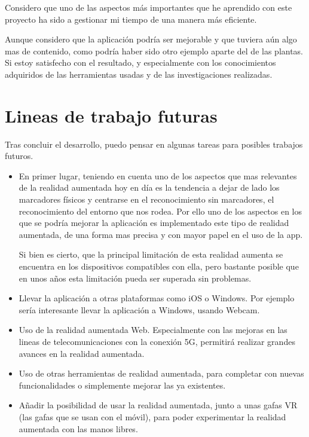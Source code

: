 Considero que uno de las aspectos más importantes que he aprendido con este proyecto ha sido a gestionar mi tiempo de una manera más eficiente.

Aunque considero que la aplicación podría ser mejorable y que tuviera aún algo mas de contenido, como podría haber sido otro ejemplo aparte del de las plantas. Si estoy satisfecho con el resultado, y especialmente con los conocimientos adquiridos de las herramientas usadas y de las investigaciones realizadas.

\section{Lineas de trabajo futuras}
Tras concluir el desarrollo, puedo pensar en algunas tareas para posibles trabajos futuros.
\begin{itemize}
	\item En primer lugar, teniendo en cuenta uno de los aspectos que mas relevantes de la realidad aumentada hoy en día es la tendencia a dejar de lado los marcadores físicos y centrarse en el reconocimiento sin marcadores, el reconocimiento del entorno que nos rodea.
	Por ello uno de los aspectos en los que se podría mejorar la aplicación es implementado este tipo de realidad aumentada, de una forma mas precisa y con mayor papel en el uso de la app.
	
	Si bien es cierto, que la principal limitación de esta realidad aumenta se encuentra en los dispositivos compatibles con ella, pero bastante posible que en unos años esta limitación pueda ser superada sin problemas.
	\item Llevar la aplicación a otras plataformas como iOS o Windows. Por ejemplo sería interesante llevar la aplicación a Windows, usando Webcam.
	\item Uso de la realidad aumentada Web. Especialmente con las mejoras en las lineas de telecomunicaciones con la conexión 5G, permitirá realizar grandes avances en la realidad aumentada.
	\item Uso de otras herramientas de realidad aumentada, para completar con nuevas funcionalidades o simplemente mejorar las ya existentes.
	\item Añadir la posibilidad de usar la realidad aumentada, junto a unas gafas VR (las gafas que se usan con el móvil), para poder experimentar la realidad aumentada con las manos libres. 
	
\end{itemize}

